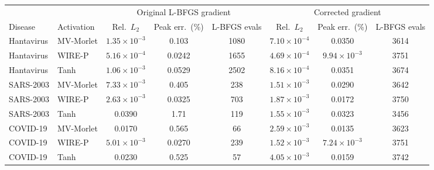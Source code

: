 \begin{tabular}{llcccccc}
\toprule
 & & \multicolumn{3}{c}{Original L-BFGS gradient} & \multicolumn{3}{c}{Corrected gradient} \\
\cmidrule(lr){3-5}\cmidrule(lr){6-8}
Disease & Activation & Rel.\ $L_2$ & Peak err.\ (\%) & L-BFGS evals & Rel.\ $L_2$ & Peak err.\ (\%) & L-BFGS evals \\
\midrule
Hantavirus & MV-Morlet & $1.35\times10^{-3}$ & 0.103 & 1080 & $7.10\times10^{-4}$ & 0.0350 & 3614 \\
Hantavirus & WIRE-P & $5.16\times10^{-4}$ & 0.0242 & 1655 & $4.69\times10^{-4}$ & $9.94\times10^{-3}$ & 3751 \\
Hantavirus & Tanh & $1.06\times10^{-3}$ & 0.0529 & 2502 & $8.16\times10^{-4}$ & 0.0351 & 3674 \\
SARS-2003 & MV-Morlet & $7.33\times10^{-3}$ & 0.405 & 238 & $1.51\times10^{-3}$ & 0.0290 & 3642 \\
SARS-2003 & WIRE-P & $2.63\times10^{-3}$ & 0.0325 & 703 & $1.87\times10^{-3}$ & 0.0172 & 3750 \\
SARS-2003 & Tanh & 0.0390 & 1.71 & 119 & $1.55\times10^{-3}$ & 0.0323 & 3456 \\
COVID-19 & MV-Morlet & 0.0170 & 0.565 & 66 & $2.59\times10^{-3}$ & 0.0135 & 3623 \\
COVID-19 & WIRE-P & $5.01\times10^{-3}$ & 0.0270 & 239 & $1.52\times10^{-3}$ & $7.24\times10^{-3}$ & 3751 \\
COVID-19 & Tanh & 0.0230 & 0.525 & 57 & $4.05\times10^{-3}$ & 0.0159 & 3742 \\
\bottomrule
\end{tabular}